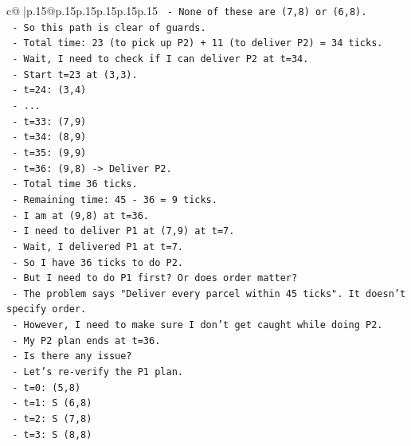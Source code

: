 \documentclass{article}
\begin{document}
{\begin{supertabular}{c@{$\;$}|p{.15\linewidth}@{}p{.15\linewidth}p{.15\linewidth}p{.15\linewidth}p{.15\linewidth}p{.15\linewidth}}
{{{\texttt{            {-}   None of these are (7,8) or (6,8).} \\
\texttt{            {-}   So this path is clear of guards.} \\
\texttt{            {-}   Total time: 23 (to pick up P2) + 11 (to deliver P2) = 34 ticks.} \\
\texttt{            {-}   Wait, I need to check if I can deliver P2 at t=34.} \\
\texttt{            {-}   Start t=23 at (3,3).} \\
\texttt{            {-}   t=24: (3,4)} \\
\texttt{            {-}   ...} \\
\texttt{            {-}   t=33: (7,9)} \\
\texttt{            {-}   t=34: (8,9)} \\
\texttt{            {-}   t=35: (9,9)} \\
\texttt{            {-}   t=36: (9,8) {-}> Deliver P2.} \\
\texttt{            {-}   Total time 36 ticks.} \\
\texttt{            {-}   Remaining time: 45 {-} 36 = 9 ticks.} \\
\texttt{            {-}   I am at (9,8) at t=36.} \\
\texttt{            {-}   I need to deliver P1 at (7,9) at t=7.} \\
\texttt{            {-}   Wait, I delivered P1 at t=7.} \\
\texttt{            {-}   So I have 36 ticks to do P2.} \\
\texttt{            {-}   But I need to do P1 first? Or does order matter?} \\
\texttt{            {-}   The problem says "Deliver every parcel within 45 ticks". It doesn't specify order.} \\
\texttt{            {-}   However, I need to make sure I don't get caught while doing P2.} \\
\texttt{            {-}   My P2 plan ends at t=36.} \\
\texttt{            {-}   Is there any issue?} \\
\texttt{            {-}   Let's re{-}verify the P1 plan.} \\
\texttt{            {-}   t=0: (5,8)} \\
\texttt{            {-}   t=1: S (6,8)} \\
\texttt{            {-}   t=2: S (7,8)} \\
\texttt{            {-}   t=3: S (8,8)} \\
}}}
\end{supertabular}}
\end{document}
